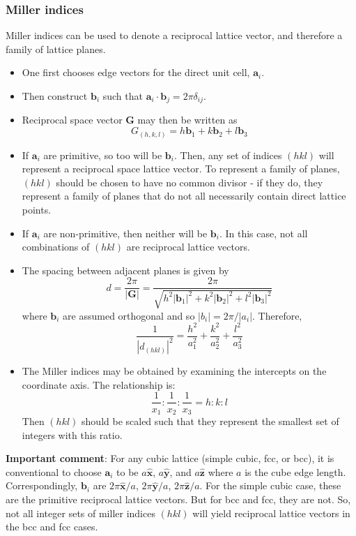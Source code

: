 \documentclass[10pt]{article}
\begin{document}
\subsubsection{Miller indices}
Miller indices can be used to denote a reciprocal lattice vector, and therefore a family of lattice planes.
\begin{itemize}
  \item One first chooses edge vectors for the direct unit cell, $\textbf{a}_{i}$.
  \item Then construct $\textbf{b}_{i}$ such that $\textbf{a}_{i}\cdot \textbf{b}_{j} = 2\pi\delta_{ij}$.
  \item Reciprocal space vector $\textbf{G}$ may then be written as
  $$G_{(h,k,l)} = h\textbf{b}_{1} + k\textbf{b}_{2} + l\textbf{b}_{3}$$
  \item If $\textbf{a}_{i}$ are primitive, so too will be $\textbf{b}_{i}$. Then, any set of indices $(hkl)$ will represent a reciprocal
  space lattice vector. To represent a family of planes, $(hkl)$ should be chosen to have no common divisor - if they do, they represent a family
  of planes that do not all necessarily contain direct lattice points.
  \item If $\textbf{a}_{i}$ are non-primitive, then neither will be $\textbf{b}_{i}$. In this case, not all combinations of $(hkl)$ are reciprocal lattice vectors.
  \item The spacing between adjacent planes is given by
  $$ d = \frac{2\pi}{|\textbf{G}|} = \frac{2\pi}{\sqrt{h^{2}|\textbf{b}_{1}|^{2} + k^{2}|\textbf{b}_{2}|^{2} + l^{2}|\textbf{b}_{3}|^{2}}}$$
  where $\textbf{b}_{i}$ are assumed orthogonal and so $|b_{i}| = 2\pi/|a_{i}|$. Therefore,
  $$\frac{1}{|d_{(hkl)}|^{2}} = \frac{h^2}{a_{1}^2} + \frac{k^2}{a_{2}^2} + \frac{l^2}{a_{3}^2}$$
  \item The Miller indices may be obtained by examining the intercepts on the coordinate axis. The relationship is:
  $$
  \frac{1}{x_{1}}:\frac{1}{x_{2}}:\frac{1}{x_{3}} = h:k:l
  $$
  Then $(hkl)$ should be scaled such that they represent the smallest set of integers with this ratio.
\end{itemize}

\textbf{Important comment}: For any cubic lattice (simple cubic, fcc, or bcc), it is conventional to choose $\textbf{a}_{i}$ to be $a\hat{\textbf{x}}$, $a\hat{\textbf{y}}$,
and $a\hat{\textbf{z}}$ where $a$ is the cube edge length. Correspondingly, $\textbf{b}_{i}$ are  $2\pi\hat{\textbf{x}}/a$, $2\pi\hat{\textbf{y}}/a$, $2\pi\hat{\textbf{z}}/a$.
For the simple cubic case, these are the primitive reciprocal lattice vectors. But for bcc and fcc, they are not. So, not all integer sets of miller indices $(hkl)$ will yield
reciprocal lattice vectors in the bcc and fcc cases.
\end{document}
